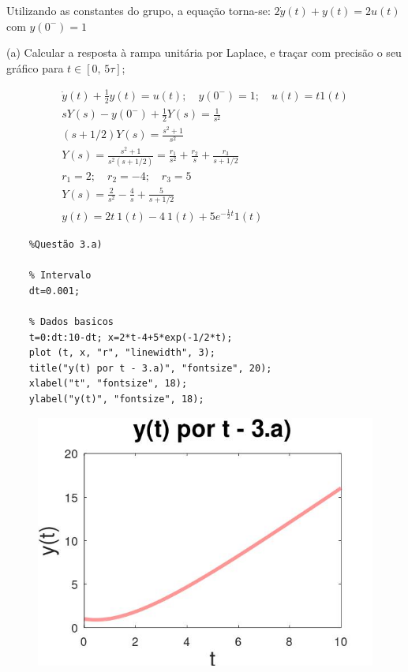 \documentclass[10pt]{article}
\begin{document}
Utilizando as constantes do grupo, a equação torna-se: $2 \dot{y}(t) + y(t) = 2 u(t)$ com $y(0^-) = 1$

(a) Calcular a resposta à rampa unitária por Laplace, e traçar com precisão o seu gráfico para $t \in [0,\,5\tau]$;

\begin{align*}
    \dot{y}(t) + \frac{1}{2} y(t) = u(t); \quad y(0^-) = 1; \quad u(t) = t1(t) \\
    sY(s) - y(0^-) + \frac{1}{2} Y(s) = \frac{1}{s^2} \\
    (s + 1/2)Y(s) = \frac{s^2 + 1}{s^2} \\
    Y(s) = \frac{s^2 + 1}{s^2(s + 1/2)} = \frac{r_1}{s^2} + \frac{r_2}{s} + \frac{r_3}{s + 1/2} \\
    r_1 = 2; \quad r_2 = -4; \quad r_3 = 5 \\
    Y(s) = \frac{2}{s^2} - \frac{4}{s} + \frac{5}{s + 1/2} \\
    y(t) = 2t \ 1(t) - 4 \ 1(t) + 5e^{-\frac{1}{2} t} 1(t)
\end{align*}

\begin{verbatim}
    %Questão 3.a)

    % Intervalo
    dt=0.001;

    % Dados basicos
    t=0:dt:10-dt; x=2*t-4+5*exp(-1/2*t);
    plot (t, x, "r", "linewidth", 3);
    title("y(t) por t - 3.a)", "fontsize", 20);
    xlabel("t", "fontsize", 18);
    ylabel("y(t)", "fontsize", 18);
\end{verbatim}

\begin{figure}[h]
    \includegraphics[scale=0.3]{questao3a.jpg}
    \centering
\end{figure}
\end{document}
